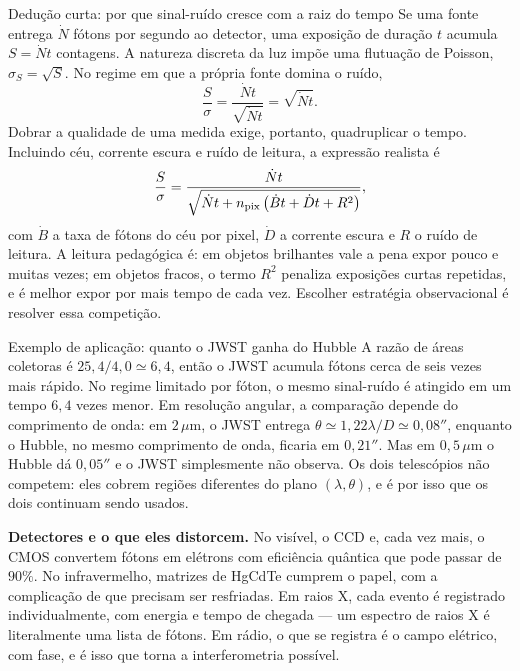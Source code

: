 \documentclass[11pt,a4paper]{article}
\begin{document}
\begin{lessonblock}[borderline west={2pt}{0pt}{astroGold}]{Dedução curta: por que sinal-ruído cresce com a raiz do tempo}
Se uma fonte entrega $\dot{N}$ fótons por segundo ao detector, uma exposição de duração $t$ acumula $S=\dot{N}t$ contagens. A natureza discreta da luz impõe uma flutuação de Poisson, $\sigma_S=\sqrt{S}$. No regime em que a própria fonte domina o ruído,
\[
\frac{S}{\sigma}=\frac{\dot{N}t}{\sqrt{\dot{N}t}}=\sqrt{\dot{N}t}.
\]
Dobrar a qualidade de uma medida exige, portanto, quadruplicar o tempo. Incluindo céu, corrente escura e ruído de leitura, a expressão realista é
\[
\frac{S}{\sigma}=\frac{\dot{N}t}{\sqrt{\dot{N}t+n_{\rm pix}\left(\dot{B}t+\dot{D}t+R^2\right)}},
\]
com $\dot{B}$ a taxa de fótons do céu por pixel, $\dot{D}$ a corrente escura e $R$ o ruído de leitura. A leitura pedagógica é: em objetos brilhantes vale a pena expor pouco e muitas vezes; em objetos fracos, o termo $R^2$ penaliza exposições curtas repetidas, e é melhor expor por mais tempo de cada vez. Escolher estratégia observacional é resolver essa competição.
\end{lessonblock}

\begin{lessonblock}{Exemplo de aplicação: quanto o JWST ganha do Hubble}
A razão de áreas coletoras é $25{,}4/4{,}0\simeq6{,}4$, então o JWST acumula fótons cerca de seis vezes mais rápido. No regime limitado por fóton, o mesmo sinal-ruído é atingido em um tempo $6{,}4$ vezes menor. Em resolução angular, a comparação depende do comprimento de onda: em $2\,\mu\mathrm{m}$, o JWST entrega $\theta\simeq1{,}22\lambda/D\simeq0{,}08''$, enquanto o Hubble, no mesmo comprimento de onda, ficaria em $0{,}21''$. Mas em $0{,}5\,\mu\mathrm{m}$ o Hubble dá $0{,}05''$ e o JWST simplesmente não observa. Os dois telescópios não competem: eles cobrem regiões diferentes do plano $(\lambda,\theta)$, e é por isso que os dois continuam sendo usados.
\end{lessonblock}

\textbf{Detectores e o que eles distorcem.} No visível, o CCD e, cada vez mais, o CMOS convertem fótons em elétrons com eficiência quântica que pode passar de $90\%$. No infravermelho, matrizes de HgCdTe cumprem o papel, com a complicação de que precisam ser resfriadas. Em raios X, cada evento é registrado individualmente, com energia e tempo de chegada --- um espectro de raios X é literalmente uma lista de fótons. Em rádio, o que se registra é o campo elétrico, com fase, e é isso que torna a interferometria possível.
\end{document}
